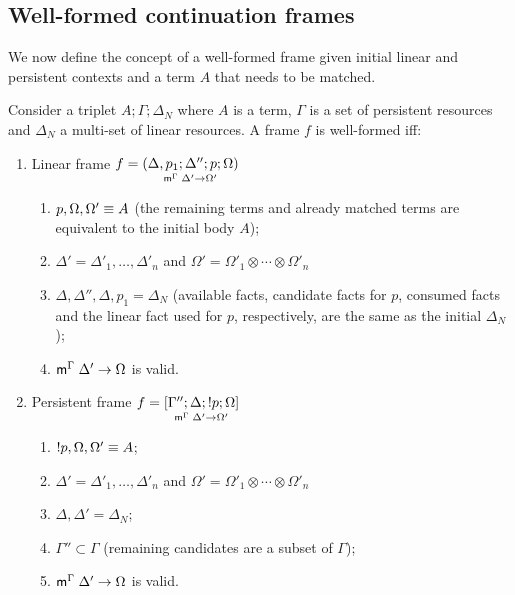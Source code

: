 \subsection{Well-formed continuation frames}

We now define the concept of a well-formed frame given initial linear and
persistent contexts and a term $A$ that needs to be matched.

\begin{definition}

Consider a triplet $A; \Gamma; \Delta_{N}$ where $A$ is a term, $\Gamma$ is a
set of persistent resources and $\Delta_{N}$ a multi-set of linear
resources. A frame $f$ is well-formed iff:

\begin{enumerate}[leftmargin=*]
   \item Linear frame $f = \lframe{\Delta,
      p_1}{\Delta''}{p}{\Omega}{\Delta'}{\Omega'}$

   \begin{enumerate}
      \item $\feq{p, \Omega, \Omega'}{A}$ (the remaining terms and already
               matched terms are equivalent to the initial body $A$);
      \item $\Delta' = \Delta'_1, \dotsc, \Delta'_n$ and $\Omega' =
      \Omega'_1 \otimes \dotsb \otimes \Omega'_n$
      \item $\Delta, \Delta'', \Delta, p_1 = \Delta_{N}$ (available facts, candidate
            facts for $p$, consumed facts and the linear fact used for $p$,
            respectively, are the same as the initial $\Delta_{N}$);
      \item $\mz{\Gamma}{\Delta'}{\Omega}$ is valid.

   \end{enumerate}
   \item Persistent frame $f = \pframe{\Gamma''}{\Delta}{\bang
   p}{\Omega}{\Delta'}{\Omega'}$
      \begin{enumerate}
         \item $\feq{\bang p, \Omega, \Omega'}{A}$;
         \item $\Delta' = \Delta'_1, \dotsc, \Delta'_n$ and $\Omega' =
         \Omega'_1 \otimes \dotsb \otimes \Omega'_n$
         \item $\Delta, \Delta' = \Delta_{N}$;
         \item $\Gamma'' \subset \Gamma$ (remaining candidates are a subset of
                     $\Gamma$);
         \item $\mz{\Gamma}{\Delta'}{\Omega}$ is valid.
      \end{enumerate}
\end{enumerate}
\end{definition}


